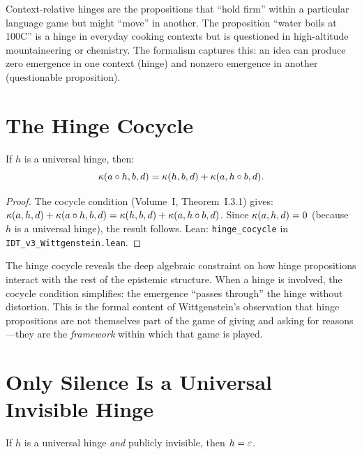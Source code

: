 \begin{interpretation}
Context-relative hinges are the propositions that ``hold firm'' within a
particular language game but might ``move'' in another. The proposition ``water
boils at 100\textdegree C'' is a hinge in everyday cooking contexts but is
questioned in high-altitude mountaineering or chemistry. The formalism captures
this: an idea can produce zero emergence in one context (hinge) and nonzero
emergence in another (questionable proposition).
\end{interpretation}

\section{The Hinge Cocycle}

\begin{theorem}
\label{thm:hinge-cocycle}
If $h$ is a universal hinge, then:
\[
\kappa(a \circ h, b, d) = \kappa(h, b, d) + \kappa(a, h \circ b, d).
\]
\end{theorem}

\begin{proof}
The cocycle condition (Volume~I, Theorem~I.3.1) gives:
$\kappa(a, h, d) + \kappa(a \circ h, b, d) = \kappa(h, b, d) + \kappa(a, h \circ b, d)$.
Since $\kappa(a, h, d) = 0$ (because $h$ is a universal hinge), the result follows.
Lean: \texttt{hinge\_cocycle} in \texttt{IDT\_v3\_Wittgenstein.lean}.
\end{proof}

\begin{interpretation}
The hinge cocycle reveals the deep algebraic constraint on how hinge
propositions interact with the rest of the epistemic structure. When a hinge
is involved, the cocycle condition simplifies: the emergence ``passes through''
the hinge without distortion. This is the formal content of Wittgenstein's
observation that hinge propositions are not themselves part of the game of
giving and asking for reasons---they are the \emph{framework} within which
that game is played.
\end{interpretation}

\section{Only Silence Is a Universal Invisible Hinge}

\begin{theorem}
\label{thm:only-void-hinge}
If $h$ is a universal hinge \emph{and} publicly invisible, then $h = \varepsilon$.
\end{theorem}

